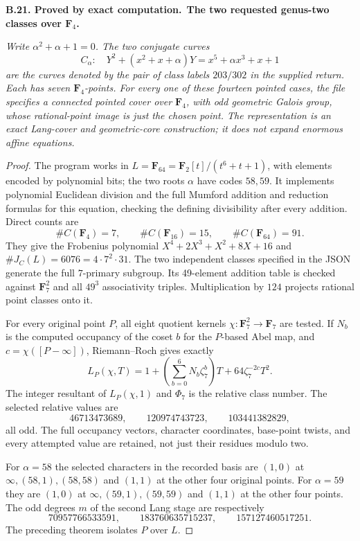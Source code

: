 \documentclass[11pt,a4paper]{article}
\newenvironment{claim}[3]{\par\medskip\noindent\hypertarget{#1}{\textbf{#1. #2.}}\ \textbf{#3.}\par\nopagebreak\smallskip\begingroup\itshape}{\endgroup\par\smallskip}
\begin{document}
\begin{claim}{B.21}{Proved by exact computation}{The two requested genus-two classes over $\mathbf F_4$}
Write $\alpha^2+\alpha+1=0$. The two conjugate curves
\[
 C_\alpha:\quad Y^2+(x^2+x+\alpha)Y
   =x^5+\alpha x^3+x+1
\]
are the curves denoted by the pair of class labels $203/302$ in
the supplied return. Each has seven $\mathbf F_4$-points.
For every one of these fourteen pointed cases, the file
 specifies a connected
pointed cover over $\mathbf F_4$, with odd geometric Galois group,
whose rational-point image is just the chosen point.
The representation is an exact Lang-cover and geometric-core
construction; it does not expand enormous affine equations.
\end{claim}
\begin{proof}
The program  works in
$L=\mathbf F_{64}=\mathbf F_2[t]/(t^6+t+1)$, with elements encoded
by polynomial bits; the two roots $\alpha$ have codes $58,59$.
It implements polynomial Euclidean division and the full Mumford
addition and reduction formulas for this equation, checking the
defining divisibility after every addition. Direct counts are
\[
 \#C(\mathbf F_4)=7,\qquad \#C(\mathbf F_{16})=15,\qquad
 \#C(\mathbf F_{64})=91.
\]
They give the Frobenius polynomial
$X^4+2X^3+X^2+8X+16$ and
$\#J_C(L)=6076=4\cdot7^2\cdot31$. The two independent classes
specified in the JSON generate the full $7$-primary subgroup.
Its 49-element addition table is checked against
$\mathbf F_7^2$ and all $49^3$ associativity triples.
Multiplication by $124$ projects rational point classes onto it.

For every original point $P$, all eight quotient kernels
$\chi:\mathbf F_7^2\to\mathbf F_7$ are tested. If $N_b$ is the
computed occupancy of the coset $b$ for the $P$-based Abel map,
and $c=\chi([P-\infty])$, Riemann--Roch gives exactly
\[
 L_P(\chi,T)=1+\left(\sum_{b=0}^6N_b\zeta_7^b\right)T
                    +64\zeta_7^{-2c}T^2 .
\]
The integer resultant of $L_P(\chi,1)$ and
$\Phi_7$ is the relative class number. The selected relative
values are
\[
 46713473689,\qquad120974743723,\qquad103441382829,
\]
all odd. The full occupancy vectors, character coordinates,
base-point twists, and every attempted value are retained, not
just their residues modulo two.

For $\alpha=58$ the selected characters in the recorded basis are
$(1,0)$ at $\infty,(58,1),(58,58)$ and $(1,1)$ at the other four
original points. For $\alpha=59$ they are $(1,0)$ at
$\infty,(59,1),(59,59)$ and $(1,1)$ at the other four points.
The odd degrees $m$ of the second Lang stage are respectively
\[
 70957766533591,\qquad183760635715237,\qquad157127460517251.
\]
The preceding theorem isolates $P$ over $L$.


\end{proof}
\end{document}
